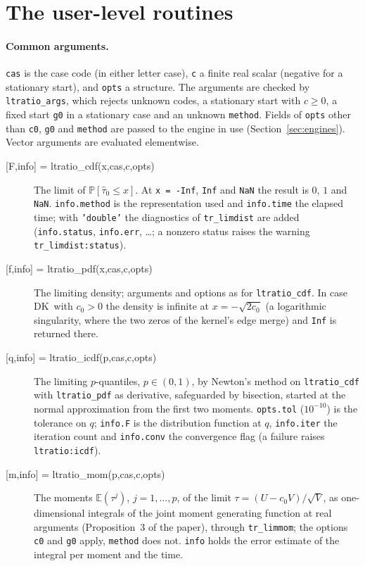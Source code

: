 \documentclass[11pt]{article}
\newcommand{\code}[1]{\texttt{#1}}
\newcommand{\E}{{\mathbb E}}
\newcommand{\PP}{{\mathbb P}}
\newcommand{\tauh}{\hat\tau}
\newcommand{\Fk}{\textsf{DK}}
\begin{document}
\section{The user-level routines}
\label{sec:user}

\paragraph{Common arguments.}  \code{cas} is the case code (in either letter case), \code{c} a finite real scalar (negative for a stationary start), and \code{opts} a structure.  The arguments are checked by \code{ltratio\_args}, which rejects unknown codes, a stationary start with $c\ge0$, a fixed start \code{g0} in a stationary case and an unknown \code{method}.  Fields of \code{opts} other than \code{c0}, \code{g0} and \code{method} are passed to the engine in use (Section~\ref{sec:engines}).  Vector arguments are evaluated elementwise.

\begin{description}
\item[{[F,info] = ltratio\_cdf(x,cas,c,opts)}]
The limit of $\PP[\tauh_0\le x]$.  At \code{x = -Inf}, \code{Inf} and \code{NaN} the result is $0$, $1$ and \code{NaN}.  \code{info.method} is the representation used and \code{info.time} the elapsed time; with \code{'double'} the diagnostics of \code{tr\_limdist} are added (\code{info.status}, \code{info.err}, \ldots; a nonzero status raises the warning \code{tr\_limdist:status}).
\item[{[f,info] = ltratio\_pdf(x,cas,c,opts)}]
The limiting density; arguments and options as for \code{ltratio\_cdf}.  In case \Fk\ with $c_0>0$ the density is infinite at $x=-\sqrt{2c_0}$ (a logarithmic singularity, where the two zeros of the kernel's edge merge) and \code{Inf} is returned there.
\item[{[q,info] = ltratio\_icdf(p,cas,c,opts)}]
The limiting $p$-quantiles, $p\in(0,1)$, by Newton's method on \code{ltratio\_cdf} with \code{ltratio\_pdf} as derivative, safeguarded by bisection, started at the normal approximation from the first two moments.  \code{opts.tol} ($10^{-10}$) is the tolerance on $q$; \code{info.F} is the distribution function at $q$, \code{info.iter} the iteration count and \code{info.conv} the convergence flag (a failure raises \code{ltratio:icdf}).
\item[{[m,info] = ltratio\_mom(p,cas,c,opts)}]
The moments $\E(\tau^j)$, $j=1,\ldots,p$, of the limit $\tau=(U-c_0V)/\sqrt V$, as one-dimensional integrals of the joint moment generating function at real arguments (Proposition~3 of the paper), through \code{tr\_limmom}; the options \code{c0} and \code{g0} apply, \code{method} does not.  \code{info} holds the error estimate of the integral per moment and the time.
\end{description}
\end{document}

